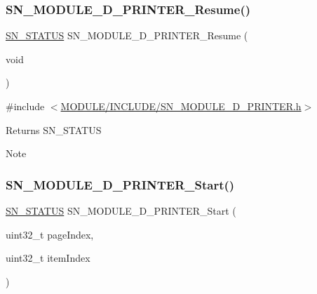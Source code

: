 \subsubsection{\texorpdfstring{S\+N\+\_\+\+M\+O\+D\+U\+L\+E\+\_\+D\+\_\+\+P\+R\+I\+N\+T\+E\+R\+\_\+\+Resume()}{SN\_MODULE\_3D\_PRINTER\_Resume()}}
{\footnotesize\ttfamily \hyperlink{group__SYSTEM__ERROR_ga4540713b9a7a18ce44d78c3a10f7442f}{S\+N\+\_\+\+S\+T\+A\+T\+US} S\+N\+\_\+\+M\+O\+D\+U\+L\+E\+\_\+D\+\_\+\+P\+R\+I\+N\+T\+E\+R\+\_\+\+Resume (\begin{DoxyParamCaption}\item[{void}]{ }\end{DoxyParamCaption})}



{\ttfamily \#include $<$\hyperlink{SN__MODULE__3D__PRINTER_8h}{M\+O\+D\+U\+L\+E/\+I\+N\+C\+L\+U\+D\+E/\+S\+N\+\_\+\+M\+O\+D\+U\+L\+E\+\_\+D\+\_\+\+P\+R\+I\+N\+T\+E\+R.\+h}$>$}

\begin{DoxyReturn}{Returns}
S\+N\+\_\+\+S\+T\+A\+T\+US
\end{DoxyReturn}
\begin{DoxyNote}{Note}

\end{DoxyNote}
\mbox{\label{group__MODULE__3D__PRINTER_ga439ebb10f8ee839218655c5177e9110b}} 
\subsubsection{\texorpdfstring{S\+N\+\_\+\+M\+O\+D\+U\+L\+E\+\_\+D\+\_\+\+P\+R\+I\+N\+T\+E\+R\+\_\+\+Start()}{SN\_MODULE\_3D\_PRINTER\_Start()}}
{\footnotesize\ttfamily \hyperlink{group__SYSTEM__ERROR_ga4540713b9a7a18ce44d78c3a10f7442f}{S\+N\+\_\+\+S\+T\+A\+T\+US} S\+N\+\_\+\+M\+O\+D\+U\+L\+E\+\_\+D\+\_\+\+P\+R\+I\+N\+T\+E\+R\+\_\+\+Start (\begin{DoxyParamCaption}\item[{uint32\+\_\+t}]{page\+Index,  }\item[{uint32\+\_\+t}]{item\+Index }\end{DoxyParamCaption})}



